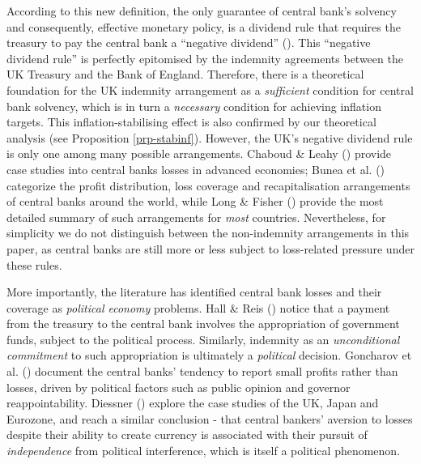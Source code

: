 \documentclass[
  a4paper,
  abstract=true]{scrartcl}
\theoremstyle{definition}
\begin{document}
According to this new definition, the only guarantee of central bank's
solvency and consequently, effective monetary policy, is a dividend rule
that requires the treasury to pay the central bank a ``negative
dividend'' (). This
``negative dividend rule'' is perfectly epitomised by the indemnity
agreements between the UK Treasury and the Bank of England. Therefore,
there is a theoretical foundation for the UK indemnity arrangement as a
\emph{sufficient} condition for central bank solvency, which is in turn
a \emph{necessary} condition for achieving inflation targets. This
inflation-stabilising effect is also confirmed by our theoretical
analysis (see Proposition \ref{prp-stabinf}). However, the UK's negative
dividend rule is only one among many possible arrangements. Chaboud \&
Leahy () provide case studies into
central banks losses in advanced economies; Bunea et al.
() categorize the profit distribution,
loss coverage and recapitalisation arrangements of central banks around
the world, while Long \& Fisher () provide
the most detailed summary of such arrangements for \emph{most}
countries. Nevertheless, for simplicity we do not distinguish between
the non-indemnity arrangements in this paper, as central banks are still
more or less subject to loss-related pressure under these rules.

More importantly, the literature has identified central bank losses and
their coverage as \emph{political economy} problems. Hall \& Reis
() notice that a payment from the treasury
to the central bank involves the appropriation of government funds,
subject to the political process. Similarly, indemnity as an
\emph{unconditional commitment} to such appropriation is ultimately a
\emph{political} decision. Goncharov et al.
() document the central banks'
tendency to report small profits rather than losses, driven by political
factors such as public opinion and governor reappointability. Diessner
() explore the case studies of the UK,
Japan and Eurozone, and reach a similar conclusion - that central
bankers' aversion to losses despite their ability to create currency is
associated with their pursuit of \emph{independence} from political
interference, which is itself a political phenomenon.
\end{document}
